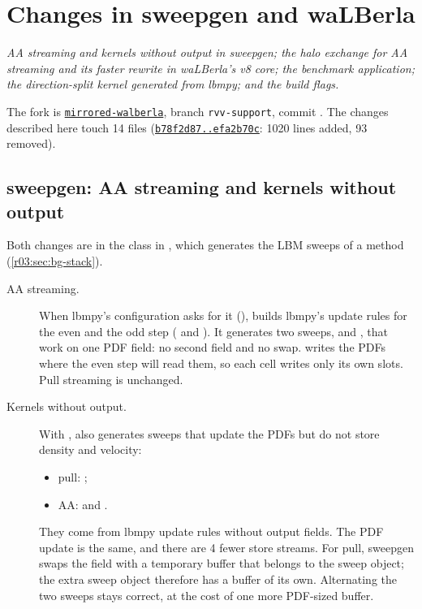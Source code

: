 \chapter{Changes in sweepgen and waLBerla}\label{r03:ch:walberla}

\emph{AA streaming and kernels without output in sweepgen; the halo exchange for AA streaming
and its faster rewrite in waLBerla's v8 core; the benchmark application; the direction-split
kernel generated from lbmpy; and the build flags.}

The fork is \href{\rWLurl/tree/\rWLsha}{\texttt{mirrored-walberla}}, branch
\texttt{rvv-support}, commit \rcommitwl. The changes described here touch 14 files
(\href{\rWLurl/compare/b78f2d8791589fa38d0e407a3447865cb8ce227f...\rWLsha}{\texttt{b78f2d87..efa2b70c}}:
1020 lines added, 93 removed).

\section{sweepgen: AA streaming and kernels without output}\label{r03:sec:wl-sweepgen}

Both changes are in the class  in
, which generates the LBM sweeps of a method
(\cref{r03:sec:bg-stack}).
\begin{description}
  \item[AA streaming.] When lbmpy's configuration asks for it
        (),  builds lbmpy's update rules
        for the even and the odd step ( and ). It
        generates two sweeps,  and , that work on
        one PDF field: no second field and no swap.  writes the PDFs where the
        even step will read them, so each cell writes only its own slots. Pull streaming is
        unchanged.
  \item[Kernels without output.] With ,  also
        generates sweeps that update the PDFs but do not store density and velocity:
        \begin{itemize}
          \item pull: ;
          \item AA:  and .
        \end{itemize}
        They come from lbmpy update rules without output fields. The PDF update is the same,
        and there are 4 fewer store streams. For pull, sweepgen swaps the field with a
        temporary buffer that belongs to the sweep object; the extra sweep object therefore has
        a buffer of its own. Alternating the two sweeps stays correct, at the cost of one more
        PDF-sized buffer.
\end{description}

